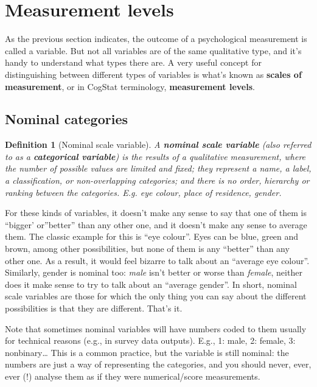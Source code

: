 \documentclass[
  11pt,
]{book}
\theoremstyle{indenteddefinition}
\newtheorem{definition}{Definition}[chapter]
\theoremstyle{indenteddefinition}
\theoremstyle{definition}
\theoremstyle{definition}
\theoremstyle{remark}
\begin{document}
\hypertarget{scales}{%
\section{Measurement levels}\label{scales}}

As the previous section indicates, the outcome of a psychological measurement is called a variable. But not all variables are of the same qualitative type, and it's handy to understand what types there are. A very useful concept for distinguishing between different types of variables is what's known as \textbf{scales of measurement}, or in CogStat terminology, \textbf{measurement levels}.

\hypertarget{nominalscale}{%
\subsection{Nominal categories}\label{nominalscale}}

\begin{definition}[Nominal scale variable]
\protect\hypertarget{def:defnominal}{}\label{def:defnominal}A \textbf{nominal scale variable} (also referred to as a \textbf{categorical variable}) is the results of a \emph{qualitative} measurement, where the number of possible values are limited and fixed; they represent a name, a label, a classification, or non-overlapping categories; and there is no order, hierarchy or ranking between the categories. E.g. eye colour, place of residence, gender.
\end{definition}

For these kinds of variables, it doesn't make any sense to say that one of them is ``bigger' or''better'' than any other one, and it doesn't make any sense to average them. The classic example for this is ``eye colour''. Eyes can be blue, green and brown, among other possibilities, but none of them is any ``better'' than any other one. As a result, it would feel bizarre to talk about an ``average eye colour''. Similarly, gender is nominal too: \emph{male} isn't better or worse than \emph{female}, neither does it make sense to try to talk about an ``average gender''. In short, nominal scale variables are those for which the only thing you can say about the different possibilities is that they are different. That's it.

Note that sometimes nominal variables will have numbers coded to them usually for technical reasons (e.g., in survey data outputs). E.g., 1: male, 2: female, 3: nonbinary\ldots{} This is a common practice, but the variable is still nominal: the numbers are just a way of representing the categories, and you should never, ever, ever (!) analyse them as if they were numerical/score measurements.
\end{document}
